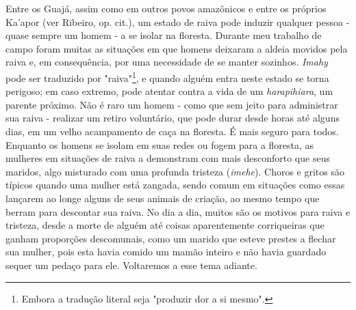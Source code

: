 Entre os Guajá, assim como em outros povos amazônicos e entre os
próprios Ka'apor (ver Ribeiro, op. cit.), um estado de raiva pode
induzir qualquer pessoa - quase sempre um homem - a se isolar na
floresta. Durante meu trabalho de campo foram muitas as situações em que
homens deixaram a aldeia movidos pela raiva e, em consequência, por uma
necessidade de se manter sozinhos. \emph{Imahy} pode ser traduzido por
"raiva"\footnote{Embora a tradução literal seja "produzir dor a si
  mesmo".}, e quando alguém entra neste estado se torna perigoso; em
caso extremo, pode atentar contra a vida de um \emph{harapihiara}, um
parente próximo. Não é raro um homem - como que sem jeito para
administrar sua raiva - realizar um retiro voluntário, que pode durar
desde horas até alguns dias, em um velho acampamento de caça na
floresta. É mais seguro para todos. Enquanto os homens se isolam em suas
redes ou fogem para a floresta, as mulheres em situações de raiva a
demonstram com mais desconforto que seus maridos, algo misturado com uma
profunda tristeza (\emph{imehe}). Choros e gritos são típicos quando uma
mulher está zangada, sendo comum em situações como essas lançarem ao
longe alguns de seus animais de criação, ao mesmo tempo que berram para
descontar sua raiva. No dia a dia, muitos são os motivos para raiva e
tristeza, desde a morte de alguém até coisas aparentemente corriqueiras
que ganham proporções descomunais, como um marido que esteve prestes a
flechar sua mulher, pois esta havia comido um mamão inteiro e não havia
guardado sequer um pedaço para ele. Voltaremos a esse tema adiante.

